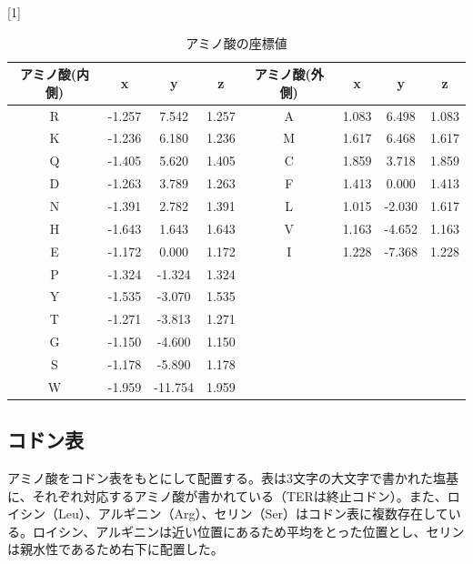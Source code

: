 \documentclass[a4paper,12pt]{jsreport}
\begin{document}
\begin{table}[H]
\centering
\caption{アミノ酸の座標値}
\scalebox{1}[1]{
\begin{tabular}{|cccc|cccc|} \hline
アミノ酸(内側) & x & y & z & アミノ酸(外側) & x & y & z \\ \hline
R & -1.257 & 7.542 & 1.257 & A & 1.083 & 6.498 & 1.083 \\[-2mm]
K & -1.236 & 6.180 & 1.236 & M & 1.617 & 6.468 & 1.617 \\[-2mm]
Q & -1.405 & 5.620 & 1.405 & C & 1.859 & 3.718 & 1.859 \\[-2mm]
D & -1.263 & 3.789 & 1.263 & F & 1.413 & 0.000 & 1.413 \\[-2mm]
N & -1.391 & 2.782 & 1.391 & L & 1.015 & -2.030 & 1.617 \\[-2mm]
H & -1.643 & 1.643 & 1.643 & V & 1.163 & -4.652 & 1.163 \\[-2mm]
E & -1.172 & 0.000 & 1.172 & I & 1.228 & -7.368 & 1.228 \\[-2mm]
P & -1.324 & -1.324 & 1.324 &&&& \\[-2mm]
Y & -1.535 & -3.070 & 1.535 &&&& \\[-2mm]
T & -1.271 & -3.813 & 1.271 &&&& \\[-2mm]
G & -1.150 & -4.600 & 1.150 &&&& \\[-2mm]
S & -1.178 & -5.890 & 1.178 &&&& \\[-2mm]
W & -1.959 & -11.754 & 1.959 &&&& \\ \hline
\end{tabular}
}
\end{table}



\subsection{コドン表}
アミノ酸をコドン表をもとにして配置する。表は3文字の大文字で書かれた塩基に、それぞれ対応するアミノ酸が書かれている（TERは終止コドン）。また、ロイシン（Leu）、アルギニン（Arg）、セリン（Ser）はコドン表に複数存在している。ロイシン、アルギニンは近い位置にあるため平均をとった位置とし、セリンは親水性であるため右下に配置した。
\end{document}
